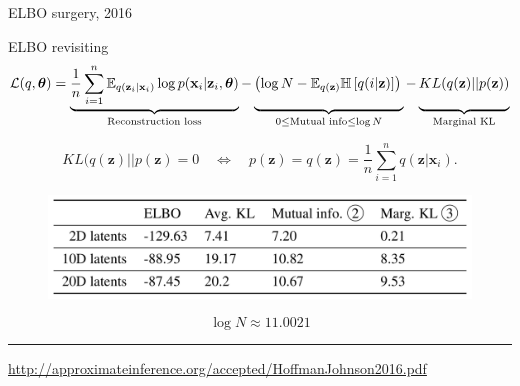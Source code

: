\documentclass{beamer}
\newcommand{\bx}{\mathbf{x}}
\newcommand{\bz}{\mathbf{z}}
\newcommand{\btheta}{\boldsymbol{\theta}}
\begin{document}
\begin{frame}{ELBO surgery, 2016}
\begin{block}{ELBO revisiting}
\vspace{-0.3cm}
{\footnotesize
\[
    \mathcal{L}(q, \btheta) = \underbrace{\frac{1}{n} \sum_{i=1}^n \mathbb{E}_{q(\bz_i | \bx_i)} \log p(\bx_i | \bz_i, \btheta)}_{\text{Reconstruction loss}} - \underbrace{\left(\log N - \mathbb{E}_{q(\bz)} \mathbb{H} \left[ q(i | \bz) \right] \right)\vphantom{\sum_{i=1}}}_{0 \leq \text{Mutual info} \leq \log N } - \underbrace{KL(q(\bz) || p(\bz))\vphantom{\sum_{i=1}}}_{\text{Marginal KL}}
\]}
\end{block}
\vspace{-0.3cm}
\[
    KL(q(\bz) || p(\bz) = 0 \quad \Leftrightarrow \quad p (\bz) = q(\bz) = \frac{1}{n} \sum_{i=1}^n q(\bz | \bx_i).
\]
\begin{figure}
    \centering
    \includegraphics[width=0.8\linewidth]{figs/ELBO_surgery.png}
\end{figure}
\[
\log N \approx 11.0021
\]
\vfill
\hrule\medskip
{\scriptsize \href{http://approximateinference.org/accepted/HoffmanJohnson2016.pdf}{http://approximateinference.org/accepted/HoffmanJohnson2016.pdf}}
\end{frame}
\end{document}

